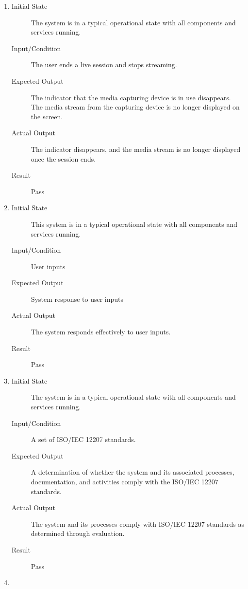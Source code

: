 \documentclass[12pt, titlepage]{article}
\begin{document}
\begin{enumerate}[NFR-T1]
  \item \label{NFRT26}
    \begin{description}
    \item[Initial State] The system is in a typical operational state with all
      components and services running.
    \item[Input/Condition] The user ends a live session and stops streaming.
    \item[Expected Output] The indicator that the media capturing device is in use
      disappears. The media stream from the capturing device is no longer
      displayed on the screen.
    \item[Actual Output] The indicator disappears, and the media stream is no 
    longer displayed once the session ends.
    \item[Result] Pass 
    \end{description}
  \item \label{NFRT27}
    \begin{description}
    \item[Initial State] This system is in a typical operational state with all
      components and services running.
    \item[Input/Condition] User inputs
    \item[Expected Output] System response to user inputs
    \item[Actual Output] The system responds effectively to user inputs.
    \item[Result] Pass 
    \end{description}
  \item \label{NFRT28}
    \begin{description}
    \item[Initial State] The system is in a typical operational state with all
      components and services running.
    \item[Input/Condition] A set of ISO/IEC 12207 standards.
    \item[Expected Output] A determination of whether the system and its associated
      processes, documentation, and activities comply with the ISO/IEC 12207
      standards.
    \item[Actual Output] The system and its processes comply with ISO/IEC 12207 
    standards as determined through evaluation.
    \item[Result] Pass 
    \end{description}
  \item \label{NFRT29}
    \begin{description}

\end{description}
\end{enumerate}
\end{document}
